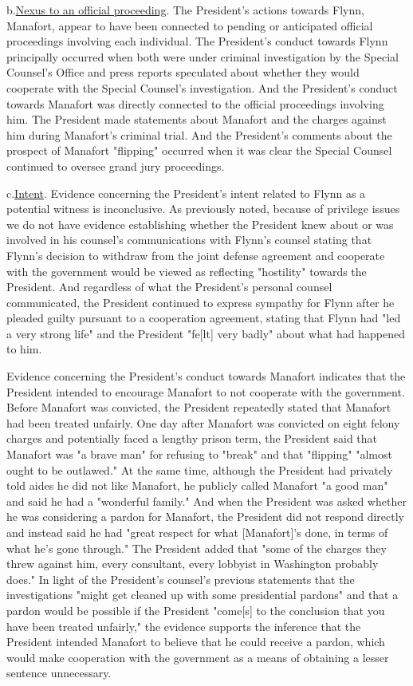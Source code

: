 
b.\qquad\underline{Nexus to an official proceeding}.
The President's actions towards Flynn, Manafort, appear to have been connected to pending or anticipated official proceedings involving each individual.
The President's conduct towards Flynn principally occurred when both were under criminal investigation by the Special Counsel's Office and press reports speculated about whether they would cooperate with the Special Counsel's investigation.
And the President's conduct towards Manafort was directly connected to the official proceedings involving him.
The President made statements about Manafort and the charges against him during Manafort's criminal trial.
And the President's comments about the prospect of Manafort "flipping" occurred when it was clear the Special Counsel continued to oversee grand jury proceedings.

c.\qquad\underline{Intent}.
Evidence concerning the President's intent related to Flynn as a potential witness is inconclusive.
As previously noted, because of privilege issues we do not have evidence establishing whether the President knew about or was involved in his counsel's communications with Flynn's counsel stating that Flynn's decision to withdraw from the joint defense agreement and cooperate with the government would be viewed as reflecting "hostility" towards the President.
And regardless of what the President's personal counsel communicated, the President continued to express sympathy for Flynn after he pleaded guilty pursuant to a cooperation agreement, stating that Flynn had "led a very strong life" and the President "fe[lt] very badly" about what had happened to him.

Evidence concerning the President's conduct towards Manafort indicates that the President intended to encourage Manafort to not cooperate with the government.
Before Manafort was convicted, the President repeatedly stated that Manafort had been treated unfairly.
One day after Manafort was convicted on eight felony charges and potentially faced a lengthy prison term, the President said that Manafort was "a brave man" for refusing to "break" and that "flipping" "almost ought to be outlawed."
At the same time, although the President had privately told aides he did not like Manafort, he publicly called Manafort "a good man" and said he had a "wonderful family."
And when the President was asked whether he was considering a pardon for Manafort, the President did not respond directly and instead said he had "great respect for what [Manafort]'s done, in terms of what he's gone through."
The President added that "some of the charges they threw against him, every consultant, every lobbyist in Washington probably does."
In light of the President's counsel's previous statements that the investigations "might get cleaned up with some presidential pardons" and that a pardon would be possible if the President "come[s] to the conclusion that you have been treated unfairly," the evidence supports the inference that the President intended Manafort to believe that he could receive a pardon, which would make cooperation with the government as a means of obtaining a lesser sentence unnecessary.

